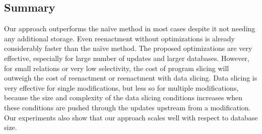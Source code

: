 \subsection{Summary}
Our approach outperforms the naïve method in most cases despite it not needing any additional storage. Even reenactment without optimizations is already considerably faster than the naïve method.
The proposed optimizations are very effective, especially for large number of updates and larger databases. However, for small relations or very low selectivity, the cost of program slicing will outweigh the cost of reenactment or reenactment with data slicing. Data slicing is very effective for single modifications, but less so for multiple modifications, because the size and complexity of the data slicing conditions increases when these conditions are pushed through the updates upstream from a modification. Our experiments also show that our approach scales well with respect to database size.

